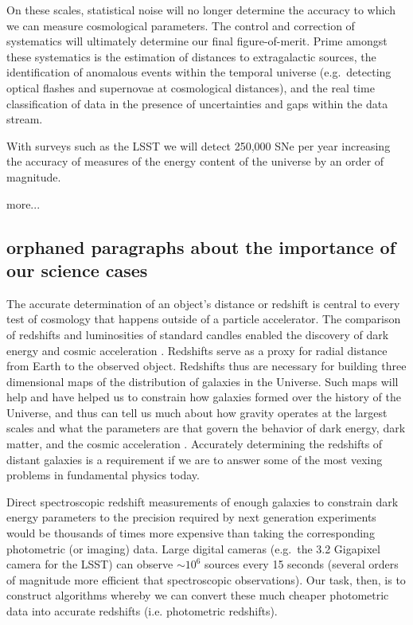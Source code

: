 \documentclass[useAMS,usenatbib,tightenlines,11pt,preprint]{aastex}
\begin{document}
 On
these scales, statistical noise will no longer determine the accuracy
to which we can measure cosmological parameters. The control and
correction of systematics will ultimately determine our final
figure-of-merit. Prime amongst these systematics is the estimation of
distances to extragalactic sources, the identification of anomalous
events within the temporal universe (e.g.\ detecting optical flashes
and supernovae at cosmological distances), and the real time
classification of data in the presence of uncertainties and gaps
within the data stream.

With surveys such as the LSST we will detect 250,000 SNe per year
increasing the accuracy of measures of the energy content of the
universe by an order of magnitude.


more...

\subsection{orphaned paragraphs about the importance of our science cases}

The accurate determination of an object's distance or redshift is
central to every test of cosmology that happens outside of a particle
accelerator.  The comparison of redshifts and luminosities of standard
candles enabled the discovery of dark energy and cosmic acceleration
\cite{perlmutter1998}. Redshifts serve as a proxy for radial distance
from Earth to the observed object.  Redshifts thus are necessary for
building three dimensional maps of the distribution of galaxies in the
Universe.  Such maps will help and have helped us to constrain how
galaxies formed over the history of the Universe, and thus can tell us
much about how gravity operates at the largest scales and what the
parameters are that govern the behavior of dark energy, dark matter, 
and the cosmic
acceleration \cite{muvarpi2,roland,sudeep,linder2013}.  Accurately determining the redshifts of
distant galaxies is a requirement if we are to answer some of the most
vexing problems in fundamental physics today.

Direct spectroscopic redshift measurements of enough galaxies to
constrain dark energy parameters to the precision required by next
generation experiments would be thousands of times more expensive than
taking the corresponding photometric (or imaging) data.  Large digital
cameras (e.g.\ the 3.2 Gigapixel camera for the LSST) can observe
$\sim 10^6$ sources every 15 seconds (several orders of magnitude more
efficient that spectroscopic observations). Our task, then, is to
construct algorithms whereby we can convert these much cheaper
photometric data into accurate redshifts (i.e. photometric redshifts).
\end{document}
